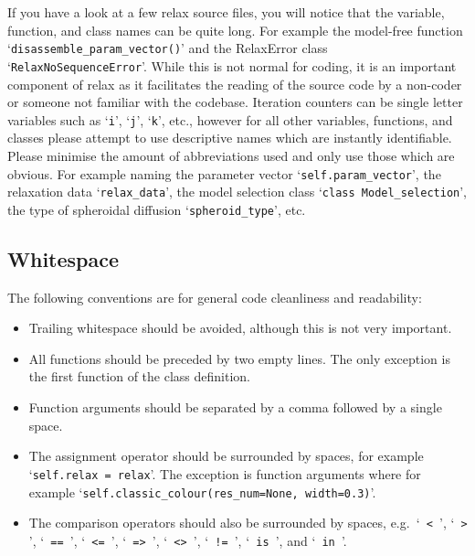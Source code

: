 If you have a look at a few relax source files, you will notice that the variable, function, and class names can be quite long.  For example the model-free function `\verb|disassemble_param_vector()|' and the RelaxError class `\verb|RelaxNoSequenceError|'.  While this is not normal for coding, it is an important component of relax as it facilitates the reading of the source code by a non-coder or someone not familiar with the codebase.  Iteration counters can be single letter variables such as `\verb|i|', `\verb|j|', `\verb|k|', etc., however for all other variables, functions, and classes please attempt to use descriptive names which are instantly identifiable.  Please minimise the amount of abbreviations used and only use those which are obvious.  For example naming the parameter vector `\verb|self.param_vector|', the relaxation data `\verb|relax_data|', the model selection class `\verb|class Model_selection|', the type of spheroidal diffusion `\verb|spheroid_type|', etc.



\subsection{Whitespace}

The following conventions are for general code cleanliness and readability:

\begin{itemize}
\item Trailing whitespace should be avoided, although this is not very important.
\item All functions should be preceded by two empty lines.  The only exception is the first function of the class definition.
\item Function arguments should be separated by a comma followed by a single space.
\item The assignment operator should be surrounded by spaces, for example `\verb*|self.relax = relax|'.  The exception is function arguments where for example `\verb*|self.classic_colour(res_num=None, width=0.3)|'.
\item The comparison operators should also be surrounded by spaces, e.g.\ `\verb*| < |', `\verb*| > |', `\verb*| == |', `\verb*| <= |', `\verb*| => |', `\verb*| <> |', `\verb*| != |', `\verb*| is |', and `\verb*| in |'.
\end{itemize}

